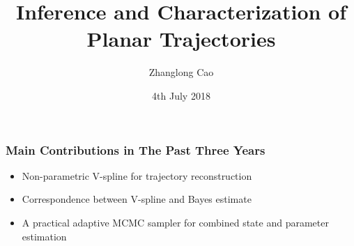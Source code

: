 \documentclass{beamer}
\title[]{Inference and Characterization of Planar Trajectories} %
\author{Zhanglong Cao} %
\institute[UO] %
{
Department of Mathematics \& Statistics \\
University of Otago %
}
\date{4th July 2018} %
\begin{document}
\begin{frame}
\titlepage %
\end{frame}




\begin{frame}
\frametitle{Main Contributions in The Past Three Years}
\begin{itemize}
	\item Non-parametric V-spline for trajectory reconstruction
	\item Correspondence between V-spline and Bayes estimate
	\item A practical adaptive MCMC sampler for combined state and parameter estimation
\end{itemize}

\end{frame}
\end{document}
